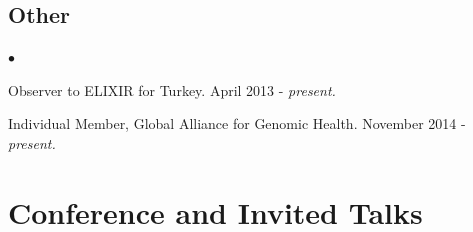 \documentclass[margin,line]{res}
\newenvironment{list2}{
  \begin{list}{$\bullet$}{%
      \setlength{\itemsep}{0in}
      \setlength{\parsep}{0in} \setlength{\parskip}{0in}
      \setlength{\topsep}{0in} \setlength{\partopsep}{0in} 
      \setlength{\leftmargin}{0.2in}}}{\end{list}}
\begin{document}
\begin{resume}
\vspace{-0.6cm}
\subsection{\small \sc Other}
\begin{list2}
\item
  Observer to ELIXIR for Turkey. April 2013 - {\it present.}
\item
  Individual Member, Global Alliance for Genomic Health. November 2014 - {\it present.}
\end{list2}



\vspace*{-.2cm}
\section{\sc Conference and Invited Talks}


\end{resume}
\end{document}

